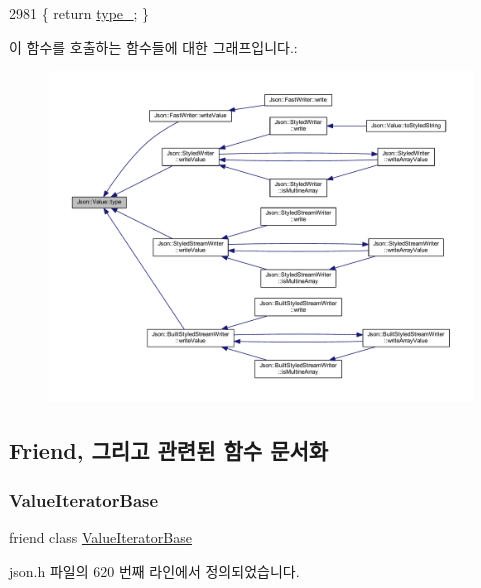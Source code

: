 \begin{DoxyCode}
2981 \{ \textcolor{keywordflow}{return} \hyperlink{class_json_1_1_value_abd222c2536dc88bf330dedcd076d2356}{type\_}; \}
\end{DoxyCode}
이 함수를 호출하는 함수들에 대한 그래프입니다.\+:\nopagebreak
\begin{figure}[H]
\begin{center}
\leavevmode
\includegraphics[width=350pt]{class_json_1_1_value_a8ce61157a011894f0252ceed232312de_icgraph}
\end{center}
\end{figure}


\subsection{Friend, 그리고 관련된 함수 문서화}
\mbox{\label{class_json_1_1_value_ad016df56489e5d360735457afba2f649}} 
\subsubsection{\texorpdfstring{Value\+Iterator\+Base}{ValueIteratorBase}}
{\footnotesize\ttfamily friend class \hyperlink{class_json_1_1_value_iterator_base}{Value\+Iterator\+Base}\hspace{0.3cm}{\ttfamily [friend]}}



json.\+h 파일의 620 번째 라인에서 정의되었습니다.



